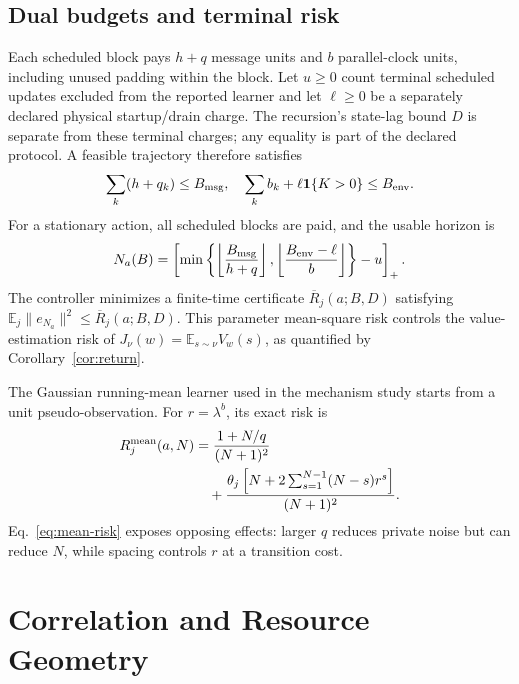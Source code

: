 \documentclass[journal]{IEEEtran}
\newcommand{\E}{\mathbb{E}}
\begin{document}
\subsection{Dual budgets and terminal risk}
Each scheduled block pays $h+q$ message units and $b$ parallel-clock units, including unused padding within the block.
Let $u\ge0$ count terminal scheduled updates excluded from the reported learner and let $\ell\ge0$ be a separately declared physical startup/drain charge.
The recursion's state-lag bound $D$ is separate from these terminal charges; any equality is part of the declared protocol.
A feasible trajectory therefore satisfies
\begin{equation}
\sum_k(h+q_k)\le B_{\rm msg},
\quad
\sum_k b_k+\ell\mathbf{1}\{K>0\}\le B_{\rm env}.
\label{eq:budgets}
\end{equation}
For a stationary action, all scheduled blocks are paid, and the usable horizon is
\begin{equation}
N_a(B)=\left[\min\left\{\left\lfloor\frac{B_{\rm msg}}{h+q}\right\rfloor,
\left\lfloor\frac{B_{\rm env}-\ell}{b}\right\rfloor\right\}-u\right]_+.
\label{eq:usable-horizon}
\end{equation}
The controller minimizes a finite-time certificate $\overline R_j(a;B,D)$ satisfying $\E_j\|e_{N_a}\|^2\le\overline R_j(a;B,D)$.
This parameter mean-square risk controls the value-estimation risk of $J_\nu(w)=\E_{s\sim\nu}V_w(s)$, as quantified by Corollary~\ref{cor:return}.

The Gaussian running-mean learner used in the mechanism study starts from a unit pseudo-observation.
For $r=\lambda^b$, its exact risk is
\begin{align}
R_j^{\rm mean}(a,N)&=\frac{1+N/q}{(N+1)^2}\nonumber\\
&\quad+\frac{\theta_j\left[N+2\sum_{s=1}^{N-1}(N-s)r^s\right]}{(N+1)^2}.
\label{eq:mean-risk}
\end{align}
Eq.~\eqref{eq:mean-risk} exposes opposing effects: larger $q$ reduces private noise but can reduce $N$, while spacing controls $r$ at a transition cost.

\section{Correlation and Resource Geometry}
\end{document}
